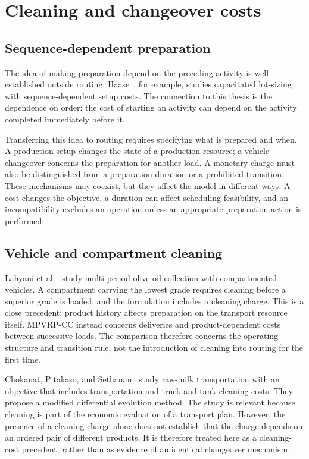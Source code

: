 \section{Cleaning and changeover costs}\label{sec:cleaning-changeover}

\subsection{Sequence-dependent preparation}

The idea of making preparation depend on the preceding activity is well
established outside routing. Haase~\cite{haase1994setup}, for example, studies
capacitated lot-sizing with sequence-dependent setup costs. The connection
to this thesis is the dependence on order: the cost of starting an activity
can depend on the activity completed immediately before it.

Transferring this idea to routing requires specifying what is prepared and
when. A production setup changes the state of a production resource; a
vehicle changeover concerns the preparation for another load. A monetary
charge must also be distinguished from a preparation duration or a
prohibited transition. These mechanisms may coexist, but they affect the
model in different ways. A cost changes the objective, a duration can affect
scheduling feasibility, and an incompatibility excludes an operation unless
an appropriate preparation action is performed.

\subsection{Vehicle and compartment cleaning}

Lahyani et al.~\cite{lahyani2015oilmulticompartment} study multi-period
olive-oil collection with compartmented vehicles. A compartment carrying
the lowest grade requires cleaning before a superior grade is loaded, and
the formulation includes a cleaning charge. This is a close precedent:
product history affects preparation on the transport resource itself.
MPVRP-CC instead concerns deliveries and product-dependent costs between
successive loads. The comparison therefore concerns the operating structure
and transition rule, not the introduction of cleaning into routing for the
first time.

Chokanat, Pitakaso, and Sethanan~\cite{agriengineering1010006} study raw-milk
transportation with an objective that includes transportation and truck and
tank cleaning costs. They propose a modified differential evolution method.
The study is relevant because cleaning is part of the economic evaluation
of a transport plan. However, the presence of a cleaning charge alone does
not establish that the charge depends on an ordered pair of different
products. It is therefore treated here as a cleaning-cost precedent, rather
than as evidence of an identical changeover mechanism.

